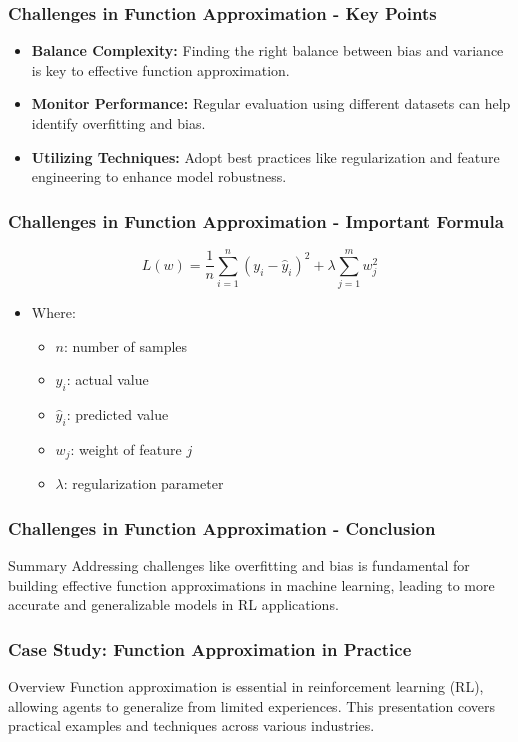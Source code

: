 \documentclass[aspectratio=169]{beamer}
\begin{document}
\begin{frame}[fragile]
    \frametitle{Challenges in Function Approximation - Key Points}
    \begin{itemize}
        \item \textbf{Balance Complexity:} Finding the right balance between bias and variance is key to effective function approximation.
        \item \textbf{Monitor Performance:} Regular evaluation using different datasets can help identify overfitting and bias.
        \item \textbf{Utilizing Techniques:} Adopt best practices like regularization and feature engineering to enhance model robustness.
    \end{itemize}
\end{frame}

\begin{frame}[fragile]
    \frametitle{Challenges in Function Approximation - Important Formula}
    \begin{equation}
        L(w) = \frac{1}{n} \sum_{i=1}^{n} (y_i - \hat{y}_i)^2 + \lambda \sum_{j=1}^{m} w_j^2 
    \end{equation}
    \begin{itemize}
        \item Where:
        \begin{itemize}
            \item $n$: number of samples
            \item $y_i$: actual value
            \item $\hat{y}_i$: predicted value
            \item $w_j$: weight of feature $j$
            \item $\lambda$: regularization parameter
        \end{itemize}
    \end{itemize}
\end{frame}

\begin{frame}[fragile]
    \frametitle{Challenges in Function Approximation - Conclusion}
    \begin{block}{Summary}
        Addressing challenges like overfitting and bias is fundamental for building effective function approximations in machine learning, leading to more accurate and generalizable models in RL applications.
    \end{block}
\end{frame}

\begin{frame}[fragile]
    \frametitle{Case Study: Function Approximation in Practice}
    \begin{block}{Overview}
        Function approximation is essential in reinforcement learning (RL), allowing agents to generalize from limited experiences. This presentation covers practical examples and techniques across various industries.
    \end{block}
\end{frame}
\end{document}
